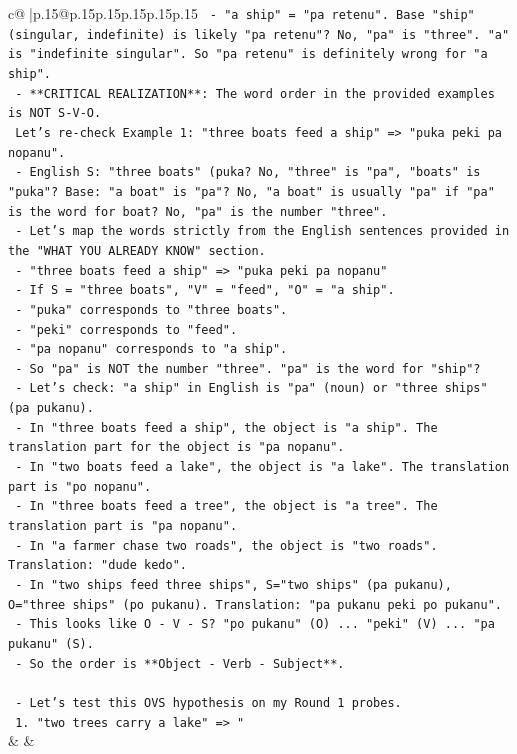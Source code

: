 \documentclass{article}
\begin{document}
{\begin{supertabular}{c@{$\;$}|p{.15\linewidth}@{}p{.15\linewidth}p{.15\linewidth}p{.15\linewidth}p{.15\linewidth}p{.15\linewidth}}
{{{\texttt{   {-} "a ship" = "pa retenu". Base "ship" (singular, indefinite) is likely "pa retenu"? No, "pa" is "three". "a" is "indefinite singular". So "pa retenu" is definitely wrong for "a ship".} \\
\texttt{   {-} **CRITICAL REALIZATION**: The word order in the provided examples is NOT S{-}V{-}O.} \\
\texttt{   Let's re{-}check Example 1: "three boats feed a ship" => "puka peki pa nopanu".} \\
\texttt{   {-} English S: "three boats" (puka? No, "three" is "pa", "boats" is "puka"? Base: "a boat" is "pa"? No, "a boat" is usually "pa" if "pa" is the word for boat? No, "pa" is the number "three".} \\
\texttt{   {-} Let's map the words strictly from the English sentences provided in the "WHAT YOU ALREADY KNOW" section.} \\
\texttt{   {-} "three boats feed a ship" => "puka peki pa nopanu"} \\
\texttt{     {-} If S = "three boats", "V" = "feed", "O" = "a ship".} \\
\texttt{     {-} "puka" corresponds to "three boats".} \\
\texttt{     {-} "peki" corresponds to "feed".} \\
\texttt{     {-} "pa nopanu" corresponds to "a ship".} \\
\texttt{     {-} So "pa" is NOT the number "three". "pa" is the word for "ship"?} \\
\texttt{     {-} Let's check: "a ship" in English is "pa" (noun) or "three ships" (pa pukanu).} \\
\texttt{     {-} In "three boats feed a ship", the object is "a ship". The translation part for the object is "pa nopanu".} \\
\texttt{     {-} In "two boats feed a lake", the object is "a lake". The translation part is "po nopanu".} \\
\texttt{     {-} In "three boats feed a tree", the object is "a tree". The translation part is "pa nopanu".} \\
\texttt{     {-} In "a farmer chase two roads", the object is "two roads". Translation: "dude kedo".} \\
\texttt{     {-} In "two ships feed three ships", S="two ships" (pa pukanu), O="three ships" (po pukanu). Translation: "pa pukanu peki po pukanu".} \\
\texttt{       {-} This looks like O {-} V {-} S? "po pukanu" (O) ... "peki" (V) ... "pa pukanu" (S).} \\
\texttt{       {-} So the order is **Object {-} Verb {-} Subject**.} \\
\\ 
\texttt{   {-} Let's test this OVS hypothesis on my Round 1 probes.} \\
\texttt{   1. "two trees carry a lake" => "} \\
            }
        }
    }
    & & \\ \\


\end{supertabular}}
\end{document}
